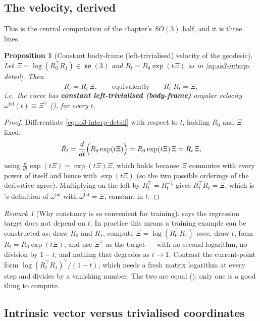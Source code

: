 \documentclass[11pt,a4paper]{report}
\newtheorem{proposition}[proposition]{Proposition}
\theoremstyle{definition}
\theoremstyle{remark}
\newtheorem{remark}[remark]{Remark}
\DeclareMathOperator{\so}{\mathfrak{so}}
\begin{document}
\subsection{The velocity, derived}

This is the central computation of the chapter's $SO(3)$ half, and it is
three lines.

\begin{proposition}[Constant body-frame (left-trivialised) velocity of the geodesic]
\label{prop:so3-constant-velocity}
Let $\Xi=\log(R_0^\top R_1)\in\so(3)$ and $R_t=R_0\exp(t\Xi)$ as in
\eqref{eq:so3-interp-detail}. Then
\[
\dot R_t = R_t\,\Xi ,
\qquad\text{equivalently}\qquad
R_t^\top\dot R_t = \Xi ,
\]
i.e.\ the curve has \textbf{constant left-trivialised (body-frame)} angular
velocity $\omega^{\mathrm{bd}}(t)\equiv\Xi^\vee$
(), for every $t$.
\end{proposition}

\begin{proof}
Differentiate \eqref{eq:so3-interp-detail} with respect to $t$, holding
$R_0$ and $\Xi$ fixed:
\[
\dot R_t = \frac{d}{dt}\Bigl(R_0\exp(t\Xi)\Bigr) = R_0\exp(t\Xi)\,\Xi = R_t\,\Xi ,
\]
using $\frac{d}{dt}\exp(t\Xi)=\exp(t\Xi)\Xi$, which holds because $\Xi$
commutes with every power of itself and hence with $\exp(t\Xi)$ (so the two
possible orderings of the derivative agree). Multiplying on the left by
$R_t^\top=R_t^{-1}$ gives $R_t^\top\dot R_t=\Xi$, which is
's definition of $\omega^{\mathrm{bd}}$
with $\widehat{\omega^{\mathrm{bd}}}=\Xi$, constant in $t$.
\end{proof}

\begin{remark}[Why constancy is so convenient for training]
\label{rem:so3-constant-convenient}
 says the regression target does not depend
on $t$. In practice this means a training example can be constructed as:
draw $R_0$ and $R_1$, compute $\Xi=\log(R_0^\top R_1)$ \emph{once}, draw
$t$, form $R_t=R_0\exp(t\Xi)$, and use $\Xi^\vee$ as the target --- with no
second logarithm, no division by $1-t$, and nothing that degrades as
$t\to1$. Contrast the current-point form
$\log(R_t^\top R_1)^\vee/(1-t)$, which needs a fresh matrix logarithm at
every step and divides by a vanishing number. The two are equal
(); only one is a good thing to compute.
\end{remark}

\subsection{Intrinsic vector versus trivialised coordinates}
\label{sec:rfm-intrinsic-vs-coords}
\end{document}
